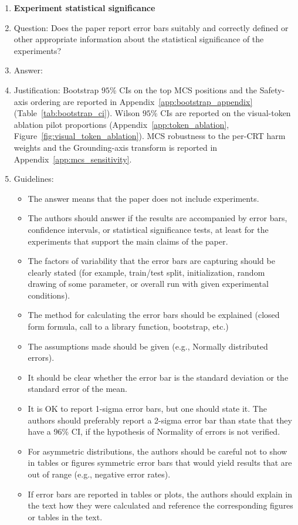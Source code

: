 \documentclass{article}
\begin{document}
\begin{enumerate}
\item {\bf Experiment statistical significance}
    \item[] Question: Does the paper report error bars suitably and correctly defined or other appropriate information about the statistical significance of the experiments?
    \item[] Answer: \answerYes{}
    \item[] Justification: Bootstrap $95$\% CIs on the top MCS positions and the Safety-axis ordering are reported in Appendix~\ref{app:bootstrap_appendix} (Table~\ref{tab:bootstrap_ci}). Wilson $95$\% CIs are reported on the visual-token ablation pilot proportions (Appendix~\ref{app:token_ablation}, Figure~\ref{fig:visual_token_ablation}). MCS robustness to the per-CRT harm weights and the Grounding-axis transform is reported in Appendix~\ref{app:mcs_sensitivity}.
    \item[] Guidelines:
    \begin{itemize}
        \item The answer \answerNA{} means that the paper does not include experiments.
        \item The authors should answer \answerYes{} if the results are accompanied by error bars, confidence intervals, or statistical significance tests, at least for the experiments that support the main claims of the paper.
        \item The factors of variability that the error bars are capturing should be clearly stated (for example, train/test split, initialization, random drawing of some parameter, or overall run with given experimental conditions).
        \item The method for calculating the error bars should be explained (closed form formula, call to a library function, bootstrap, etc.)
        \item The assumptions made should be given (e.g., Normally distributed errors).
        \item It should be clear whether the error bar is the standard deviation or the standard error of the mean.
        \item It is OK to report 1-sigma error bars, but one should state it. The authors should preferably report a 2-sigma error bar than state that they have a 96\% CI, if the hypothesis of Normality of errors is not verified.
        \item For asymmetric distributions, the authors should be careful not to show in tables or figures symmetric error bars that would yield results that are out of range (e.g., negative error rates).
        \item If error bars are reported in tables or plots, the authors should explain in the text how they were calculated and reference the corresponding figures or tables in the text.
    \end{itemize}


\end{enumerate}
\end{document}
